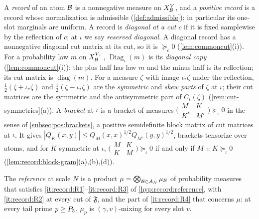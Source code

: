 \begin{definition}\label{def:cp:records}
A \emph{record} of an atom $\mathcal B$ is a nonnegative measure on $X_{\mathcal B}^V$,
and a \emph{positive record} is a record whose normalization is admissible
(\cref{def:admissible}); in particular its one-slot marginals are uniform. A
record is \emph{diagonal at a cut} $c$ if it is fixed samplewise by the
reflection of $c$; at $\iota$ we say \emph{reserved diagonal}. A diagonal
record has a nonnegative diagonal cut matrix at its cut, so it is
$\succeq_c0$ (\cref{lem:commoncut}(i)). For a probability law $m$ on
$X_{\mathcal B}^{V_+}$, $\operatorname{Diag}_\iota(m)$ is its \emph{diagonal copy}
(\cref{lem:commoncut}(i)): the plus half has law $m$ and the minus half is its
reflection; its cut matrix is $\operatorname{diag}(m)$. For a measure
$\zeta$ with image $\iota_*\zeta$ under the reflection,
$\frac12(\zeta+\iota_*\zeta)$ and $\frac12(\zeta-\iota_*\zeta)$ are the
\emph{symmetric} and \emph{skew parts} of $\zeta$ at $\iota$; their cut
matrices are the symmetric and the antisymmetric part of $C_\iota(\zeta)$
(\cref{rem:cut-symmetries}(a)). A \emph{bracket} at $\iota$ is a bracket of
measures
$\bigl(\begin{smallmatrix}M&K\\ K^*&M'\end{smallmatrix}\bigr)\succeq_\iota0$
in the sense of \cref{subsec:pos:brackets}, a positive semidefinite block
matrix of cut matrices at $\iota$. It gives
$|Q_K(x,y)|\le Q_M(x,x)^{1/2}Q_{M'}(y,y)^{1/2}$, brackets tensorize over
atoms, and for $K$ symmetric at $\iota$,
$\bigl(\begin{smallmatrix}M&K\\ K&M\end{smallmatrix}\bigr)\succeq_\iota0$ if
and only if $M\pm K\succeq_\iota0$ (\cref{lem:record:block-gram}(a),(b),(d)).
\end{definition}

\begin{definition}[(CP1) Reference]\label{def:cp1}
The \emph{reference} at scale $N$ is a product
$\mu=\bigotimes_{\mathcal B\in\mathcal A_N}\mu_{\mathcal B}$ of probability measures that
satisfies \ref{it:record:R1}--\ref{it:record:R3} of
\cref{hyp:record:reference}, with \ref{it:record:R2} at every cut of
$\mathfrak F$, and the part of \ref{it:record:R4} that concerns $\mu$: at
every tail prime $p\ge P_5$, $\mu_p$ is $(\gamma,v)$-mixing for every
slot $v$.
\end{definition}

